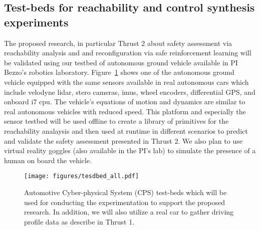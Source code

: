 \subsection{Test-beds for reachability and control synthesis experiments}


The proposed research, in particular Thrust 2 about safety assessment via reachability analysis and and reconfiguration via safe reinforcement learning will be validated using our testbed of autonomous ground vehicle available in PI Bezzo's robotics laboratory. Figure~\ref{fig:all_experiments} shows one of the autonomous ground vehicle equipped with the same sensors available in real autonomous cars which include velodyne lidar, stero cameras, imus, wheel encoders, differential GPS, and onboard i7 cpu. The vehicle's equations of motion and dynamics are similar to real autonomous vehicles with reduced speed. This platform and especially the sensor testbed will be used offline to create a library of primitives for the reachability analaysis and then used at runtime in different scenarios to predict and validate the safety assessment presented in Thrust 2. We also plan to use virtual reality goggles (also available in the PI's lab) to simulate the presence of a human on board the vehicle. 
\begin{figure}
    \centering
    \texttt{[image: figures/tesdbed\_all.pdf]}
    \caption{Automotive Cyber-physical System (CPS) test-beds which will be used for conducting the experimentation to support the proposed research. In addition, we will also utilize a real car to gather driving profile data as describe in Thrust 1. }
    \label{fig:all_experiments}
\end{figure}
